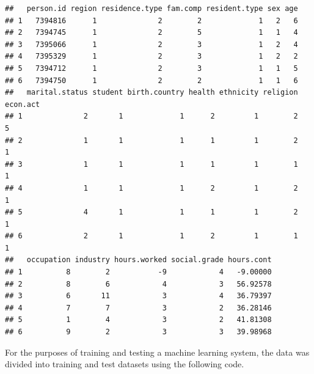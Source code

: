 \documentclass[]{book}
\newenvironment{Shaded}{\begin{snugshade}}{\end{snugshade}}
\newcommand{\KeywordTok}[1]{\textcolor[rgb]{0.13,0.29,0.53}{\textbf{#1}}}
\newcommand{\DataTypeTok}[1]{\textcolor[rgb]{0.13,0.29,0.53}{#1}}
\newcommand{\DecValTok}[1]{\textcolor[rgb]{0.00,0.00,0.81}{#1}}
\newcommand{\FloatTok}[1]{\textcolor[rgb]{0.00,0.00,0.81}{#1}}
\newcommand{\StringTok}[1]{\textcolor[rgb]{0.31,0.60,0.02}{#1}}
\newcommand{\CommentTok}[1]{\textcolor[rgb]{0.56,0.35,0.01}{\textit{#1}}}
\newcommand{\OtherTok}[1]{\textcolor[rgb]{0.56,0.35,0.01}{#1}}
\newcommand{\OperatorTok}[1]{\textcolor[rgb]{0.81,0.36,0.00}{\textbf{#1}}}
\newcommand{\NormalTok}[1]{#1}
\begin{document}
\begin{verbatim}
##   person.id region residence.type fam.comp resident.type sex age
## 1   7394816      1              2        2             1   2   6
## 2   7394745      1              2        5             1   1   4
## 3   7395066      1              2        3             1   2   4
## 4   7395329      1              2        3             1   2   2
## 5   7394712      1              2        3             1   1   5
## 6   7394750      1              2        2             1   1   6
##   marital.status student birth.country health ethnicity religion econ.act
## 1              2       1             1      2         1        2        5
## 2              1       1             1      1         1        2        1
## 3              1       1             1      1         1        1        1
## 4              1       1             1      2         1        2        1
## 5              4       1             1      1         1        2        1
## 6              2       1             1      2         1        1        1
##   occupation industry hours.worked social.grade hours.cont
## 1          8        2           -9            4   -9.00000
## 2          8        6            4            3   56.92578
## 3          6       11            3            4   36.79397
## 4          7        7            3            2   36.28146
## 5          1        4            3            2   41.81308
## 6          9        2            3            3   39.98968
\end{verbatim}

For the purposes of training and testing a machine learning system, the
data was divided into training and test datasets using the following
code.

\begin{Shaded}
\end{Shaded}
\end{document}
